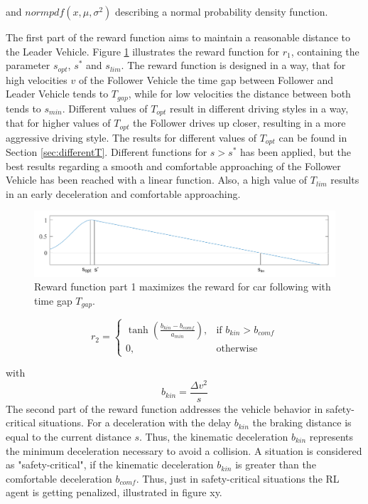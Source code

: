 \documentclass[review]{elsarticle}
\begin{document}
and $normpdf(x,\mu,\sigma^2)$ describing a normal probability density function.

The first part of the reward function aims to maintain a reasonable distance to the Leader Vehicle. Figure \ref{fig:RewardFunc1} illustrates the reward function for $r_1$, containing the parameter $s_{opt}$, $s^*$ and $s_{lim}$. The reward function is designed in a way, that for high velocities $v$ of the Follower Vehicle the time gap between Follower and Leader Vehicle tends to $T_{gap}$, while for low velocities the distance between both tends to $s_{min}$. Different values of $T_{opt}$ result in different driving styles in a way, that for higher values of $T_{opt}$ the Follower drives up closer, resulting in a more aggressive driving style. The results for different values of $T_{opt}$ can be found in Section \ref{sec:differentT}. Different functions for $ s > s^*$ has been applied, but the best results regarding a smooth and comfortable approaching of the Follower Vehicle has been reached with a linear function. Also, a high value of $T_{lim}$ results in an early deceleration and comfortable approaching. 

\begin{figure}
	\centering
	\includegraphics[width=12cm]{images/RewardFunc1}
	\caption{Reward function part 1 maximizes the reward for car following with time gap $T_{gap}$.}
	\label{fig:RewardFunc1}
\end{figure}


\begin{equation}
r_2 = 
\begin{cases}
\tanh\left(\frac{b_{kin}-b_{comf}}{a_{min}}\right),& \text{if } b_{kin}>b_{comf}\\
0,              & \text{otherwise}
\end{cases}
\end{equation}

with
\begin{equation}
b_{kin} = \frac{\Delta v^2}{s}
\end{equation}
The second part of the reward function addresses the vehicle behavior in safety-critical situations.
For a deceleration with the delay $b_{kin}$ the braking distance is equal to the current distance $s$. Thus, the kinematic deceleration $b_{kin}$ represents the minimum deceleration necessary to avoid a collision. A situation is considered as "safety-critical", if the kinematic deceleration $b_{kin}$ is greater than the comfortable deceleration $b_{comf}$. Thus, just in safety-critical situations the RL agent is getting penalized, illustrated in figure xy.
\end{document}
